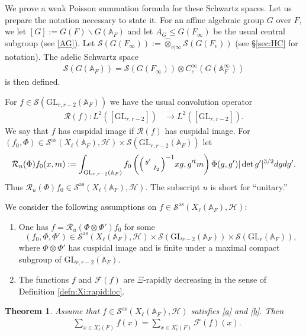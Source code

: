 \documentclass[12pt]{amsart}
\newtheorem{thm}{Theorem}[section]
\theoremstyle{remark}
\numberwithin{equation}{section}
\newcommand{\A}{\mathbb{A}}
\newcommand{\GL}{\mathrm{GL}}
\newcommand{\lto}{\longrightarrow}
\theoremstyle{definition}
\newenvironment{psmatrix}
  {\left(\begin{smallmatrix}}
  {\end{smallmatrix}\right)}
\numberwithin{equation}{subsection}
\begin{document}
We prove a weak Poisson summation formula for these Schwartz spaces.  
Let us prepare the notation necessary to state it.   
For an affine algebraic group $G$ over $F,$ we let $[G]:=G(F) \backslash G(\A_F)$ and let $A_G \leq G(F_\infty)$ be the usual central subgroup (see \eqref{AG}).
Let $\mathcal{S}(G(F_\infty)):=\widehat{\otimes}_{v|\infty}\mathcal{S}(G(F_v))$ (see \S \ref{sec:HC} for notation).
The adelic Schwartz space
\begin{align*}
    \mathcal{S}(G(\A_F))= \mathcal{S}(G(F_\infty))\otimes C^\infty_c(G(\A_F^\infty))
\end{align*}
is then defined. 

For $f \in \mathcal{S}(\GL_{r,r-2}(\A_F))$ we have the usual convolution operator
\begin{align*}
    \mathcal{R}(f):L^2([\GL_{r,r-2}]) &\lto L^2([\GL_{r,r-2}]).
\end{align*}
We say that $f$ has cuspidal image if $\mathcal{R}(f)$ has cuspidal image. For $(f_0,\Phi) \in \mathcal{S}^{\mathrm{as}}(X_{\ell}(\A_F),\mathcal{H}) \times  \mathcal{S}(\GL_{r,r-2}(\A_F)) $ let 
\begin{align*}
    \mathcal{R}_u(\Phi)f_0(x,m):=\int_{\GL_{r,r-2}(\A_F) }f_0\left(\begin{psmatrix} g' & \\ & I_2 \end{psmatrix}^{-1}xg,g'^{t}m \right)\Phi(g,g')|\det g'|^{3/2}dgdg'.
\end{align*}
Thus $\mathcal{R}_u(\Phi)f_0 \in \mathcal{S}^{\mathrm{as}}(X_{\ell}(\A_F),\mathcal{H}).$  The subscript $u$ is short for ``unitary.''  




We consider the following assumptions on $f \in \mathcal{S}^{\mathrm{as}}(X_{\ell}(\A_F),\mathcal{H}):$ 
\begin{enumerate}[label=(A\text{\arabic*}), ref=A\text{\arabic*}]
    \item One has $f=\mathcal{R}_u(\Phi \otimes \Phi')f_0$ for some 
    $$
    (f_0,\Phi,\Phi') \in \mathcal{S}^{\mathrm{as}}(X_{\ell}(\A_F),\mathcal{H}) \times \mathcal{S}(\GL_{r-2}(\A_F)) \times  \mathcal{S}(\GL_{r}(\A_F)),
    $$
    where $\Phi \otimes \Phi'$ has cuspidal image and is finite under a maximal compact subgroup of $\GL_{r,r-2}(\A_F).$ 
    \label{a}
    \item \label{b} The functions $f$ and $\mathcal{F}(f)$ are $\Xi$-rapidly decreasing in the sense of Definition \ref{defn:Xi:rapid:loc}.  
\end{enumerate}  
\begin{thm} \label{thm:PS}
Assume that $f \in \mathcal{S}^{\mathrm{as}}(X_{\ell}(\A_F),\mathcal{H})$ satisfies \eqref{a} and \eqref{b}. Then
\begin{align*}
    &
    \sum_{x\in X^\circ_{\ell}(F)}f(x)=\sum_{x \in X^\circ_{\ell}(F)}\mathcal{F}(f)(x).
\end{align*}
\end{thm}
\end{document}
